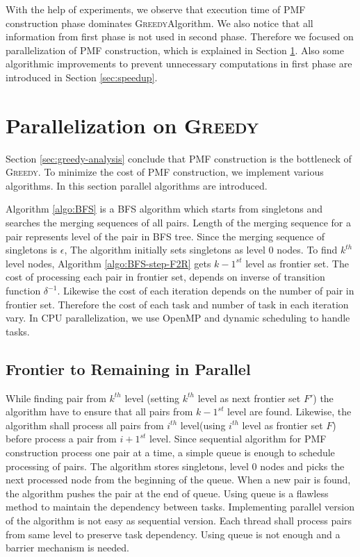 \documentclass[12pt]{article}
\newcommand{\comment}[2]{{\color{red}{\bf (#1: #2)}}}
\newcommand{\greedyAlgo}{\textsc{Greedy}}
\begin{document}
With the help of experiments, we observe that execution time of PMF construction phase dominates \greedyAlgo \space Algorithm. We also notice that all information from first phase is not used in second phase. Therefore we focused on parallelization of PMF construction, which is explained in Section \ref{sec:parallel}. Also some algorithmic improvements to prevent unnecessary computations in first phase are introduced in Section \ref{sec:speedup}.

\clearpage
\section{Parallelization on \greedyAlgo}
\label{sec:parallel}

Section \ref{sec:greedy-analysis} conclude that PMF construction is the bottleneck of \greedyAlgo . To minimize the cost of PMF construction, we implement various algorithms. In this section parallel algorithms are introduced.

Algorithm \ref{algo:BFS} is a BFS algorithm which starts from singletons and searches the merging sequences of all pairs. Length of the merging sequence for a pair represents level of the pair in BFS tree. Since the merging sequence of singletons is $\epsilon$, The algorithm initially sets singletons as level 0 nodes. To find $k^{th}$ level nodes, Algorithm \ref{algo:BFS-step-F2R} gets $k-1^{st}$ level as frontier set. The cost of processing each pair in frontier set, depends on inverse of transition function $\delta^{-1}$. Likewise the cost of each iteration depends on the number of pair in frontier set. Therefore the cost of each task and number of task in each iteration vary. In CPU parallelization, we use OpenMP and dynamic scheduling to handle tasks. 

\comment{sertac}{BFS icin ornek figure cizilebilir}

\subsection{Frontier to Remaining in Parallel}
\label{sec:BFS-F2R-parallel}

While finding pair from $k^{th}$ level (setting $k^{th}$ level as next frontier set $F'$) the algorithm have to ensure that all pairs from $k-1^{st}$ level are found. Likewise, the algorithm shall process all pairs from $i^{th}$ level(using $i^{th}$ level as frontier set $F$) before process a pair from $i+1^{st}$ level. Since sequential algorithm for PMF construction process one pair at a time, a simple queue is enough to schedule processing of pairs. The algorithm stores singletons, level 0 nodes and picks the next processed node from the beginning of the queue. When a new pair is found, the algorithm pushes the pair at the end of queue. Using queue is a flawless method to maintain the dependency between tasks. Implementing parallel version of the algorithm is not easy as sequential version. Each thread shall process pairs from same level to preserve task dependency. Using queue is not enough and a barrier mechanism is needed.
\end{document}
